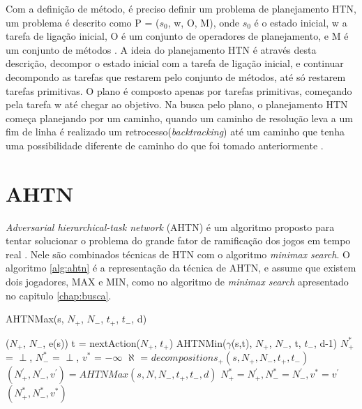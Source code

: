 Com a definição de método, é preciso definir um problema de planejamento HTN, um problema é descrito como P = ($s_{0}$, w, O, M), onde $s_{0}$ é o estado inicial, w a tarefa de ligação inicial, O é um conjunto de operadores de planejamento, e M é um conjunto de métodos \cite{ghallab2004automated}. A ideia do planejamento HTN é através desta descrição, decompor o estado inicial com a tarefa de ligação inicial, e continuar decompondo as tarefas que restarem pelo conjunto de métodos, até só restarem tarefas primitivas. O plano é composto apenas por tarefas primitivas, começando pela tarefa w até chegar ao objetivo. Na busca pelo plano, o planejamento HTN começa planejando por um caminho, quando um caminho de resolução leva a um fim de linha é realizado um retrocesso(\textit{backtracking}) até um caminho que tenha uma possibilidade diferente de caminho do que foi tomado anteriormente \cite{intelligence2003modern}. 

\section{AHTN} 

\textit{Adversarial hierarchical-task network} (AHTN) é um algoritmo proposto para tentar solucionar o problema do grande fator de ramificação dos jogos em tempo real \cite{ontanon2015adversarial}. Nele são combinados técnicas de HTN com o algoritmo \textit{minimax search}. O algoritmo \ref{alg:ahtn} \cite{ontanon2015adversarial} é a representação da técnica de AHTN, e assume que existem dois jogadores, MAX e MIN, como no algoritmo de \textit{minimax search} apresentado no capitulo \ref{chap:busca}. 

\begin{algorithm}
	\caption{AHTNMax(s, $N_{+}$, $N_{-}$, $t_{+}$, $t_{-}$, d)}
	\label{alg:ahtn}
	\begin{algorithmic}[1]
		\State	\Return ($N_{+}$, $N_{-}$, e(s))
		\EndIf
		\State t = nextAction($N_{+}$, $t_{+}$) 
		\State \Return AHTNMin($\gamma$(s,t), $N_{+}$, $N_{-}$, t, $t_{-}$, d-1)
		\EndIf
		\State $N_{+}^{*}$ = $\perp$, $N_{-}^{*}$ = $\perp$, $v^{*}$ = $-\infty$
		\State $\aleph$ = $decompositions_{+}(s, N_{+}, N_{-}, t_{+}, t_{-})$
		\State $(N^{'}_{+}, N^{'}_{-}, v^{'}) = AHTNMax(s, N, N_{-}, t_{+}, t_{-}, d)$
		\State $N_{+}^{*} = N^{'}_{+}, N_{-}^{*} = N^{'}_{-}, v^{*} = v^{'} $
		\EndIf
		\EndFor		
		\State \Return $(N_{+}^{*}, N_{-}^{*}, v^{*} )$
	\end{algorithmic}
\end{algorithm}

